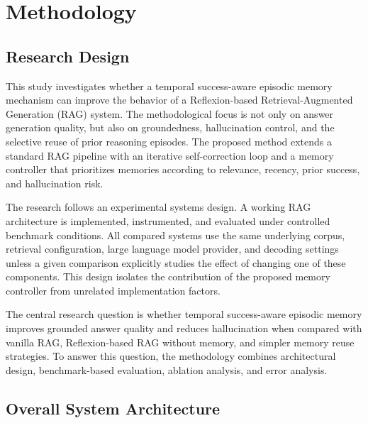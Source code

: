 %

\chapter{Methodology}
\label{chap:methodology}

\section{Research Design}
\label{sec:methodology-research-design}

This study investigates whether a temporal success-aware episodic memory mechanism can improve the behavior of a Reflexion-based Retrieval-Augmented Generation (RAG) system. The methodological focus is not only on answer generation quality, but also on groundedness, hallucination control, and the selective reuse of prior reasoning episodes. The proposed method extends a standard RAG pipeline with an iterative self-correction loop and a memory controller that prioritizes memories according to relevance, recency, prior success, and hallucination risk.

The research follows an experimental systems design. A working RAG architecture is implemented, instrumented, and evaluated under controlled benchmark conditions. All compared systems use the same underlying corpus, retrieval configuration, large language model provider, and decoding settings unless a given comparison explicitly studies the effect of changing one of these components. This design isolates the contribution of the proposed memory controller from unrelated implementation factors.

The central research question is whether temporal success-aware episodic memory improves grounded answer quality and reduces hallucination when compared with vanilla RAG, Reflexion-based RAG without memory, and simpler memory reuse strategies. To answer this question, the methodology combines architectural design, benchmark-based evaluation, ablation analysis, and error analysis.

\section{Overall System Architecture}
\label{sec:methodology-architecture}


